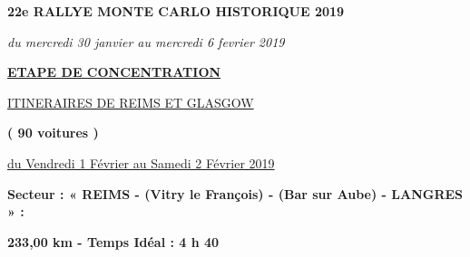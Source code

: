 \documentclass{article}%
\begin{document}
%
\normalsize%
\begin{center} \textbf{\LARGE{22e RALLYE MONTE CARLO HISTORIQUE 2019}} \end{center}%
\begin{center} \textit{du mercredi 30 janvier au mercredi 6 fevrier 2019} \end{center}%
\begin{center} \textbf{\underline{ETAPE DE CONCENTRATION}} \end{center}%
\begin{center} \underline{ITINERAIRES DE REIMS ET GLASGOW} \end{center}%
\begin{center} \textbf{( 90 voitures )} \end{center}%
\begin{flushright} \underline{du  Vendredi 1 Février au Samedi 2 Février 2019} \end{flushright}%
\begin{flushleft} \textbf{Secteur : « REIMS - (Vitry le François) - (Bar sur Aube) - LANGRES » :
} \end{flushleft}%
\begin{flushright} \textbf{233,00 km - Temps Idéal : 4 h 40
} \end{flushright}%
\end{document}
